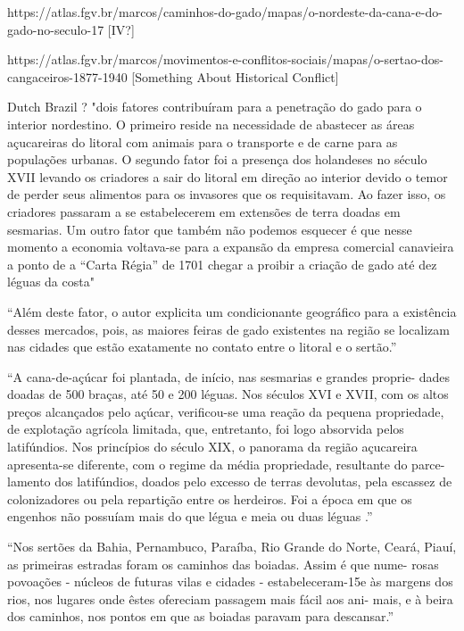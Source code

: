\documentclass{article}
\begin{document}
https://atlas.fgv.br/marcos/caminhos-do-gado/mapas/o-nordeste-da-cana-e-do-gado-no-seculo-17 [IV?]

https://atlas.fgv.br/marcos/movimentos-e-conflitos-sociais/mapas/o-sertao-dos-cangaceiros-1877-1940 [Something About Historical Conflict]

Dutch Brazil ? "dois fatores contribuíram para a penetração do gado para o interior nordestino. O primeiro reside na necessidade de abastecer as áreas açucareiras do litoral com animais para o transporte e de carne para as populações urbanas. O segundo fator foi a presença dos holandeses no século XVII levando os criadores a sair do litoral em direção ao interior devido o temor de perder seus alimentos para os invasores que os requisitavam. Ao fazer isso, os criadores passaram a se estabelecerem em extensões de terra doadas em sesmarias. Um outro fator que também não podemos esquecer é que nesse momento a economia voltava-se para a expansão da empresa comercial canavieira a ponto de a “Carta Régia” de 1701 chegar a proibir a criação de gado até dez léguas da costa" 

``Além deste fator, o autor explicita um condicionante geográfico para a existência desses mercados, pois, as maiores feiras de gado existentes na região se localizam nas cidades que estão exatamente no contato entre o litoral e o sertão.'' \parencite{Galdino_Dantas2008-pw}

``A  cana-de-açúcar foi  plantada,  de  início,  nas sesmarias  e  grandes  proprie- dades  doadas de  500  braças,  até  50  e  200  léguas.  Nos  séculos XVI  e  XVII,  com  os  altos  preços  alcançados  pelo  açúcar,  verificou-se  uma  reação  da  pequena  propriedade,  de  explotação agrícola  limitada,  que,  entretanto,  foi  logo  absorvida  pelos latifúndios. Nos  princípios  do  século  XIX, o panorama da região  açucareira  apresenta-se diferente,  com o  regime da média propriedade, resultante  do parce- lamento  dos  latifúndios,  doados  pelo  excesso  de  terras  devolutas,  pela  escassez  de  colonizadores  ou  pela  repartição  entre  os  herdeiros.  Foi  a  época  em  que  os  engenhos  não  possuíam  mais  do  que  légua  e  meia  ou  duas  léguas .''
\parencite[p.~118]{De_Geografia1970-nk}


``Nos  sertões  da  Bahia,  Pernambuco,  Paraíba,  Rio  Grande  do  Norte,  Ceará,  Piauí, as primeiras estradas foram os  caminhos das boiadas.  Assim  é  que nume- rosas  povoações  - núcleos  de  futuras  vilas  e  cidades  - estabeleceram-15e  às  margens dos rios,  nos lugares onde  êstes ofereciam passagem mais fácil  aos ani- mais,  e  à  beira  dos  caminhos,  nos  pontos  em  que  as  boiadas  paravam  para  descansar.''
\parencite[p.~164]{De_Geografia1970-nk}
\end{document}
